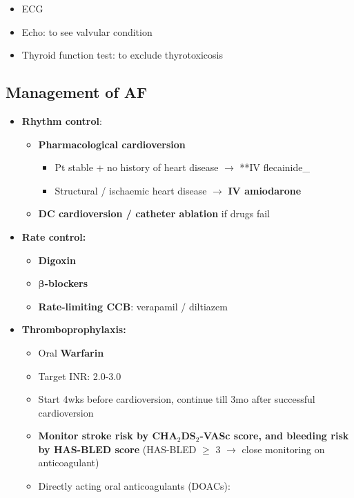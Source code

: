 \documentclass[
  12pt,
]{memoir}
\providecommand{\tightlist}{%
  \setlength{\itemsep}{0pt}\setlength{\parskip}{0pt}}
\begin{document}
\begin{itemize}
\tightlist
\item
  ECG
\item
  Echo: to see valvular condition
\item
  Thyroid function test: to exclude thyrotoxicosis
\end{itemize}

\hypertarget{management-of-af}{%
\subsection{Management of AF}\label{management-of-af}}

\begin{itemize}
\tightlist
\item
  \textbf{Rhythm control}:

  \begin{itemize}
  \tightlist
  \item
    \textbf{Pharmacological cardioversion}

    \begin{itemize}
    \tightlist
    \item
      Pt stable + no history of heart disease \(\rightarrow\) **IV
      flecainide\_
    \item
      Structural / ischaemic heart disease \(\rightarrow\) \textbf{IV
      amiodarone}
    \end{itemize}
  \item
    \textbf{DC cardioversion / catheter ablation} if drugs fail
  \end{itemize}
\item
  \textbf{Rate control:}

  \begin{itemize}
  \tightlist
  \item
    \textbf{Digoxin}
  \item
    \textbf{\(\boldsymbol\beta\)-blockers}
  \item
    \textbf{Rate-limiting CCB}: verapamil / diltiazem
  \end{itemize}
\item
  \textbf{Thromboprophylaxis:} \label{item:anticoag}

  \begin{itemize}
  \tightlist
  \item
    Oral \textbf{Warfarin}
  \item
    Target INR: 2.0-3.0
  \item
    Start 4wks before cardioversion, continue till 3mo after successful
    cardioversion
  \item
    \textbf{Monitor stroke risk by CHA\(_2\)DS\(_2\)-VASc score, and
    bleeding risk by HAS-BLED score} (HAS-BLED \(\ge\) 3 \(\rightarrow\)
    close monitoring on anticoagulant)
  \item
    Directly acting oral anticoagulants (DOACs):


\end{itemize}
\end{itemize}
\end{document}
